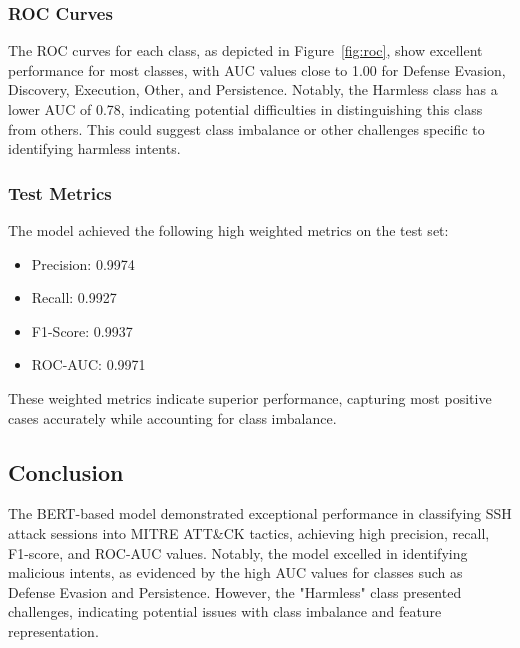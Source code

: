         \subsubsection{ROC Curves \\}

            The ROC curves for each class, as depicted in Figure~\ref{fig:roc}, show excellent performance for most classes, with AUC values close to 1.00 for Defense Evasion, Discovery, Execution, Other, and Persistence. Notably, the Harmless class has a lower AUC of 0.78, indicating potential difficulties in distinguishing this class from others. This could suggest class imbalance or other challenges specific to identifying harmless intents.
            
        \subsubsection{Test Metrics \\}
        
            The model achieved the following high weighted metrics on the test set:
            
            \begin{itemize}
                \item Precision: 0.9974
                \item Recall: 0.9927
                \item F1-Score: 0.9937
                \item ROC-AUC: 0.9971
            \end{itemize}
            
            These weighted metrics indicate superior performance, capturing most positive cases accurately while accounting for class imbalance. 
            
    \subsection{Conclusion}

        The BERT-based model demonstrated exceptional performance in classifying SSH attack sessions into MITRE ATT\&CK tactics, achieving high precision, recall, F1-score, and ROC-AUC values. Notably, the model excelled in identifying malicious intents, as evidenced by the high AUC values for classes such as Defense Evasion and Persistence. However, the "Harmless" class presented challenges, indicating potential issues with class imbalance and feature representation.

